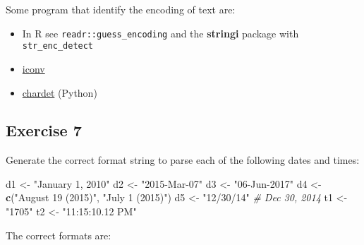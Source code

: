 \documentclass[]{book}
\newenvironment{Shaded}{\begin{snugshade}}{\end{snugshade}}
\newcommand{\CommentTok}[1]{\textcolor[rgb]{0.56,0.35,0.01}{\textit{#1}}}
\newcommand{\KeywordTok}[1]{\textcolor[rgb]{0.13,0.29,0.53}{\textbf{#1}}}
\newcommand{\NormalTok}[1]{#1}
\newcommand{\StringTok}[1]{\textcolor[rgb]{0.31,0.60,0.02}{#1}}
\providecommand{\tightlist}{%
  \setlength{\itemsep}{0pt}\setlength{\parskip}{0pt}}
\theoremstyle{definition}
\theoremstyle{definition}
\theoremstyle{definition}
\theoremstyle{remark}
\begin{document}
Some program that identify the encoding of text are:

\begin{itemize}
\tightlist
\item
  In R see \texttt{readr::guess\_encoding} and the \textbf{stringi}
  package with \texttt{str\_enc\_detect}
\item
  \href{https://en.wikipedia.org/wiki/Iconv}{iconv}
\item
  \href{https://github.com/chardet/chardet}{chardet} (Python)
\end{itemize}

\hypertarget{exercise-7-2}{%
\subsection{Exercise 7}\label{exercise-7-2}}

Generate the correct format string to parse each of the following dates
and times:

\begin{Shaded}
\begin{Highlighting}[]
\NormalTok{d1 <-}\StringTok{ "January 1, 2010"}
\NormalTok{d2 <-}\StringTok{ "2015-Mar-07"}
\NormalTok{d3 <-}\StringTok{ "06-Jun-2017"}
\NormalTok{d4 <-}\StringTok{ }\KeywordTok{c}\NormalTok{(}\StringTok{"August 19 (2015)"}\NormalTok{, }\StringTok{"July 1 (2015)"}\NormalTok{)}
\NormalTok{d5 <-}\StringTok{ "12/30/14"} \CommentTok{# Dec 30, 2014}
\NormalTok{t1 <-}\StringTok{ "1705"}
\NormalTok{t2 <-}\StringTok{ "11:15:10.12 PM"}
\end{Highlighting}
\end{Shaded}

The correct formats are:

\begin{Shaded}
\end{Shaded}
\end{document}
